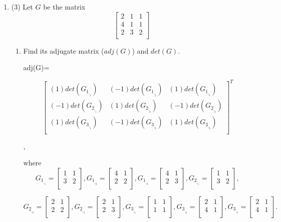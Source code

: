 \documentclass[12pt]{amsart}
\newcommand{\red}[1]{{\color{red} #1}}
\newcounter{probnum}
\newenvironment{prob}{\begin{enumerate}\setcounter{enumi}{\value{probnum}}}%
 {\setcounter{probnum}{\value{enumi}}\end{enumerate}}
\newenvironment{subprob}{\begin{enumerate}\topsep 0pt}{\end{enumerate}}
\begin{document}
\bigskip
\begin{prob} 
\item[(3)]   Let $G$ be the matrix 
$$
\left[ 
\begin{array}{ccc}
2 & 1 & 1 \\
4 & 1 & 1 \\
2 & 3 & 2 \\
\end{array} \right]
$$
\begin{subprob}
\item{}Find its adjugate matrix ($adj(G)$) and $det(G)$.

\red{adj(G)=

$$
\left[ 
\begin{array}{ccc}
(1)det(G_1_,_1) & (-1)det(G_1_,_2) & (1)det(G_1_,_3) \\
(-1)det(G_2_,_1) & (1)det(G_2_,_2) & (-1)det(G_2_,_3) \\
(1)det(G_3_,_1) & (-1)det(G_3_,_2) & (1)det(G_3_,_3) \\
\end{array} \right]^T
$$},

\red{where 
$$
G_1_,_1=\left[ 
\begin{array}{cc}
1 & 1 \\
3 & 2 \\
\end{array} \right], G_1_,_2=\left[ 
\begin{array}{cc}
4 & 1 \\
2 & 2 \\
\end{array} \right],  G_1_,_3=\left[ 
\begin{array}{cc}
4 & 1 \\
2 & 3 \\
\end{array} \right], G_2_,_1=\left[ 
\begin{array}{cc}
1 & 1 \\
3 & 2 \\
\end{array} \right],
$$}

\red{$$
G_2_,_2=\left[ 
\begin{array}{cc}
2 & 1 \\
2 & 2 \\
\end{array} \right], G_2_,_3=\left[ 
\begin{array}{cc}
2 & 1 \\
2 & 3 \\
\end{array} \right], G_3_,_1=\left[ 
\begin{array}{cc}
1 & 1 \\
1 & 1 \\
\end{array} \right], G_3_,_2=\left[ 
\begin{array}{cc}
2 & 1 \\
4 & 1 \\
\end{array} \right], G_3_,_3=\left[ 
\begin{array}{cc}
2 & 1 \\
4 & 1 \\
\end{array} \right].
$$}


\end{subprob}
\end{prob}
\end{document}
